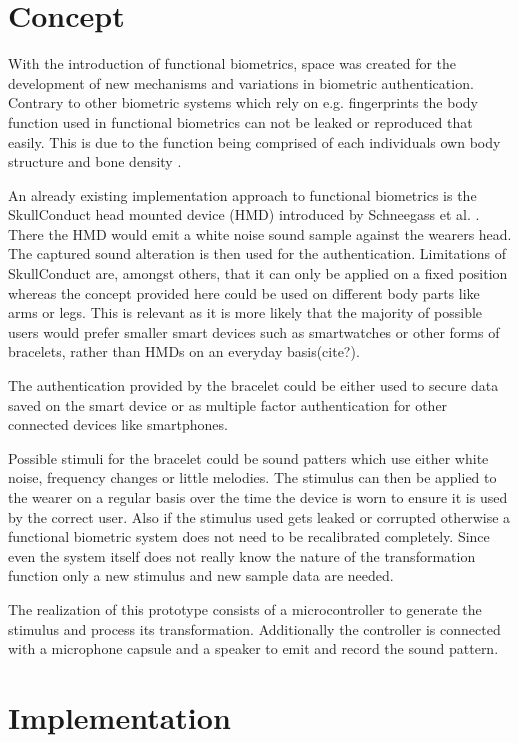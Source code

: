 \section{Concept}
With the introduction of functional biometrics, space was created for the development of new mechanisms and variations in biometric authentication.
Contrary to other biometric systems which rely on e.g. fingerprints the body function used in functional biometrics can not be leaked or reproduced that easily.
This is due to the function being comprised of each individuals own body structure and bone density \cite{schneegass2020functbiometric}.

An already existing implementation approach to functional biometrics is the SkullConduct head mounted device (HMD) introduced by Schneegass et al. \cite{SkullConduct}.
There the HMD would emit a white noise sound sample against the wearers head.
The captured sound alteration is then used for the authentication.
Limitations of SkullConduct are, amongst others, that it can only be applied on a fixed position whereas the concept provided here could be used on different body parts like arms or legs.
This is relevant as it is more likely that the majority of possible users would prefer smaller smart devices such as smartwatches or other forms of bracelets, rather than HMDs on an everyday basis(cite?).
 
The authentication provided by the bracelet could be either used to secure data saved on the smart device or as multiple factor authentication for other connected devices like smartphones.

Possible stimuli for the bracelet could be sound patters which use either white noise, frequency changes or little melodies.
The stimulus can then be applied to the wearer on a regular basis over the time the device is worn to ensure it is used by the correct user.
Also if the stimulus used gets leaked or corrupted otherwise a functional biometric system does not need to be recalibrated completely.
Since even the system itself does not really know the nature of the transformation function only a new stimulus and new sample data are needed.

The realization of this prototype consists of a microcontroller to generate the stimulus and process its transformation.
Additionally the controller is connected with a microphone capsule and a speaker to emit and record the sound pattern.
 
\section{Implementation}

